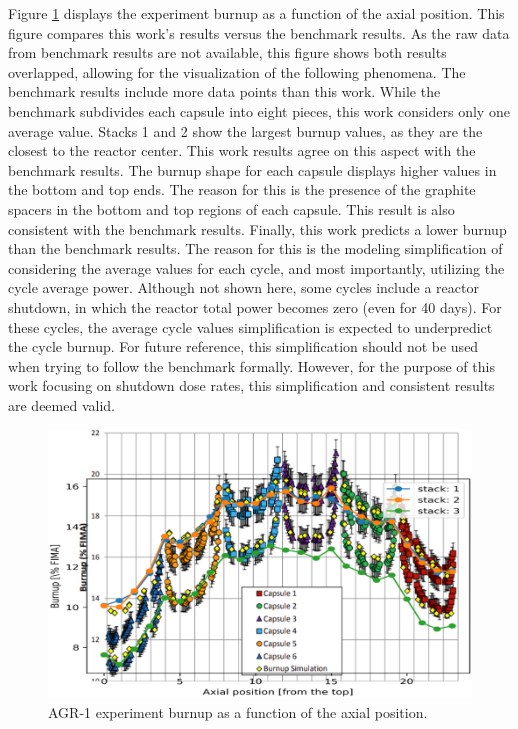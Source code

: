 Figure \ref{fig:agr-deplet} displays the experiment burnup as a function of the axial position.
This figure compares this work's results versus the benchmark results.
As the raw data from benchmark results are not available, this figure shows both results overlapped, allowing for the visualization of the following phenomena.
The benchmark results include more data points than this work.
While the benchmark subdivides each capsule into eight pieces, this work considers only one average value.
Stacks 1 and 2 show the largest burnup values, as they are the closest to the reactor center.
This work results agree on this aspect with the benchmark results.
The burnup shape for each capsule displays higher values in the bottom and top ends.
The reason for this is the presence of the graphite spacers in the bottom and top regions of each capsule.
This result is also consistent with the benchmark results.
Finally, this work predicts a lower burnup than the benchmark results.
The reason for this is the modeling simplification of considering the average values for each cycle, and most importantly, utilizing the cycle average power.
Although not shown here, some cycles include a reactor shutdown, in which the reactor total power becomes zero (even for 40 days).
For these cycles, the average cycle values simplification is expected to underpredict the cycle burnup.
For future reference, this simplification should not be used when trying to follow the benchmark formally.
However, for the purpose of this work focusing on shutdown dose rates, this simplification and consistent results are deemed valid. 

\begin{figure}[htbp!] %
    \centering
    \includegraphics[width=0.9\linewidth]{figures/agr-depletion}
    \hfill
    \caption{AGR-1 experiment burnup as a function of the axial position.}
    \label{fig:agr-deplet}
\end{figure}

